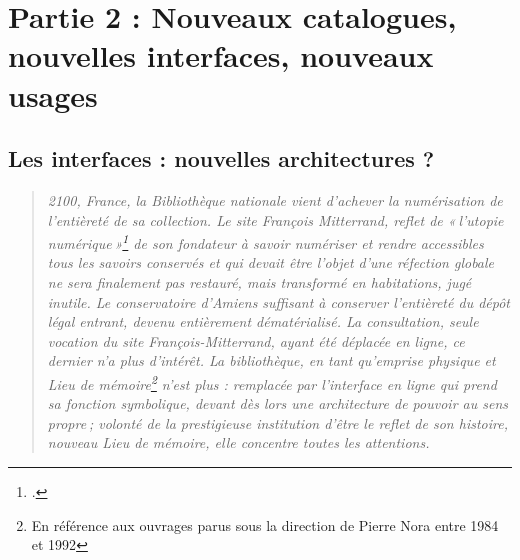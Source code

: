


\part{Partie 2 : Nouveaux catalogues, nouvelles interfaces, nouveaux usages}




\chapter{Les interfaces : nouvelles architectures ?}
\begin{quote}
	\textit{2100, France, la Bibliothèque nationale vient d’achever la numérisation de l’entièreté de sa collection. Le site François Mitterrand, reflet de « l’utopie numérique »\footcite[p. 20]{bermes2024} de son fondateur à savoir numériser et rendre accessibles tous les savoirs conservés et qui devait être l’objet d’une réfection globale ne sera finalement pas restauré, mais transformé en habitations, jugé inutile. Le conservatoire d’Amiens suffisant à conserver l’entièreté du dépôt légal entrant, devenu entièrement dématérialisé. La consultation, seule vocation du site François-Mitterrand, ayant été déplacée en ligne, ce dernier n'a plus d'intérêt. La bibliothèque, en tant qu’emprise physique et Lieu de mémoire\footnote{En référence aux ouvrages parus sous la direction de Pierre Nora entre 1984 et 1992} n’est plus : remplacée par l’interface en ligne qui prend sa fonction symbolique, devant dès lors une architecture de pouvoir au sens propre ; volonté de la prestigieuse institution d’être le reflet de son histoire, nouveau Lieu de mémoire, elle concentre toutes les attentions.}
\end{quote}

